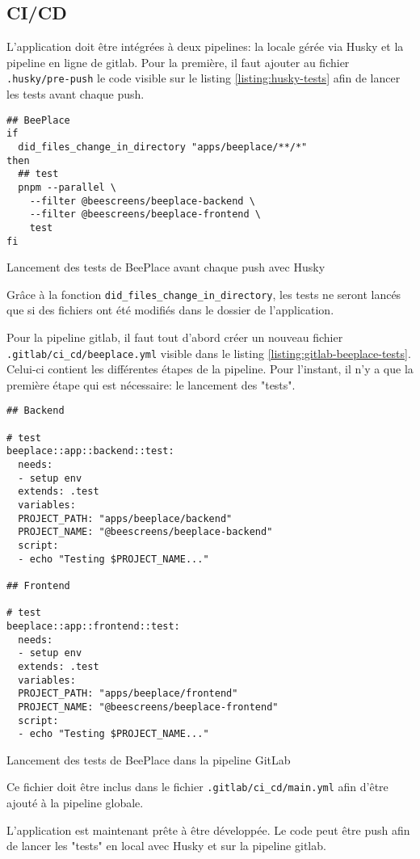 \subsection{CI/CD}

L'application doit être intégrées à deux pipelines: la locale gérée via Husky et la pipeline en ligne de \gls{gitlab}. Pour la première, il faut ajouter au fichier \texttt{.husky/pre-push} le code visible sur le listing \ref{listing:husky-tests} afin de lancer les tests avant chaque push.

\begin{listing}[H]
  \begin{verbatim}
## BeePlace
if
  did_files_change_in_directory "apps/beeplace/**/*"
then
  ## test
  pnpm --parallel \
    --filter @beescreens/beeplace-backend \
    --filter @beescreens/beeplace-frontend \
    test
fi
\end{verbatim}
  \caption{Lancement des tests de BeePlace avant chaque push avec Husky}
  \label{listing:husky-tests}
\end{listing}

Grâce à la fonction \texttt{did_files_change_in_directory}, les tests ne seront lancés que si des fichiers ont été modifiés dans le dossier de l'application.

Pour la pipeline \gls{gitlab}, il faut tout d'abord créer un nouveau fichier \texttt{.gitlab/ci_cd/beeplace.yml} visible dans le listing \ref{listing:gitlab-beeplace-tests}. Celui-ci contient les différentes étapes de la pipeline. Pour l'instant, il n'y a que la première étape qui est nécessaire: le lancement des "tests".

\begin{listing}[H]
  \begin{verbatim}
## Backend

# test
beeplace::app::backend::test:
  needs:
  - setup env
  extends: .test
  variables:
  PROJECT_PATH: "apps/beeplace/backend"
  PROJECT_NAME: "@beescreens/beeplace-backend"
  script:
  - echo "Testing $PROJECT_NAME..."

## Frontend

# test
beeplace::app::frontend::test:
  needs:
  - setup env
  extends: .test
  variables:
  PROJECT_PATH: "apps/beeplace/frontend"
  PROJECT_NAME: "@beescreens/beeplace-frontend"
  script:
  - echo "Testing $PROJECT_NAME..."
\end{verbatim}
  \caption{Lancement des tests de BeePlace dans la pipeline GitLab}
  \label{listing:gitlab-beeplace-tests}
\end{listing}

Ce fichier doit être inclus dans le fichier \texttt{.gitlab/ci_cd/main.yml} afin d'être ajouté à la pipeline globale.

L'application est maintenant prête à être développée. Le code peut être push afin de lancer les "tests" en local avec Husky et sur la pipeline \gls{gitlab}.